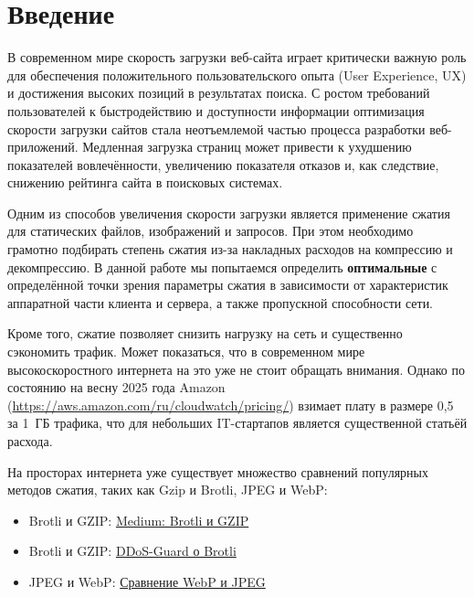 \documentclass[12pt]{article}
\begin{document}
\tableofcontents

\newpage

\section{Введение}

В современном мире скорость загрузки веб-сайта играет критически важную роль для обеспечения положительного пользовательского опыта (User Experience, UX)
и достижения высоких позиций в результатах поиска. С ростом требований пользователей к быстродействию и доступности информации оптимизация скорости
загрузки сайтов стала неотъемлемой частью процесса разработки веб-приложений. Медленная загрузка страниц может привести к ухудшению показателей вовлечённости,
увеличению показателя отказов и, как следствие, снижению рейтинга сайта в поисковых системах.

Одним из способов увеличения скорости загрузки является применение сжатия для статических файлов, изображений и запросов.
При этом необходимо грамотно подбирать степень сжатия из-за накладных расходов на компрессию и декомпрессию.
В данной работе мы попытаемся определить \textbf{оптимальные} с определённой точки зрения параметры сжатия в зависимости от характеристик аппаратной части клиента и сервера,
а также пропускной способности сети.

Кроме того, сжатие позволяет снизить нагрузку на сеть и существенно сэкономить трафик.
Может показаться, что в современном мире высокоскоростного интернета на это уже не стоит обращать внимания.
Однако по состоянию на весну 2025 года Amazon (\url{https://aws.amazon.com/ru/cloudwatch/pricing/}) взимает
плату в размере 0{,}5~\text{\$} за 1~ГБ трафика, что для небольших IT-стартапов является существенной статьёй расхода.

На просторах интернета уже существует множество сравнений популярных методов сжатия, таких как Gzip и Brotli, JPEG и WebP:

\begin{itemize}
    \item Brotli и GZIP: \href{https://medium.com/@bansal.suneet/brotli-vs-gzip-compression-surprising-compression-result-brotli-power-782aac2ee29f}{Medium: Brotli и GZIP}
    \item Brotli и GZIP: \href{https://ddos-guard.ru/blog/algoritmy-brotli-recompressiya-i-HSTS-chto-novogo-predlagaet-DDoS-GUARD}{DDoS-Guard о Brotli}
    \item JPEG и WebP: \href{https://medium.com/@inna_netum/действительно-ли-webp-лучше-jpeg-91639d852035}{Сравнение WebP и JPEG}
\end{itemize}
\end{document}
